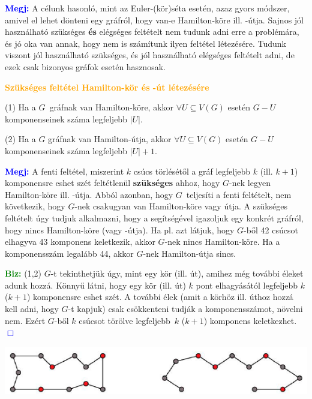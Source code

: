 \documentclass[../szamtud.tex]{subfiles}
\begin{document}
        \textcolor{blue}{\textbf{Megj:}} A célunk hasonló, mint az Euler-(kör)séta esetén, azaz gyors módszer, amivel el lehet dönteni egy gráfról, hogy van-e Hamilton-köre ill. -útja. Sajnos jól használható szükséges \textbf{és} elégséges feltételt nem tudunk adni erre a problémára, és jó oka van annak, hogy nem is számítunk ilyen feltétel létezésére. Tudunk viszont jól használható szükséges, és jól használható elégséges feltételt adni, de ezek csak bizonyos gráfok esetén hasznosak.
        
        \textcolor{orange}{\textbf{Szükséges feltétel Hamilton-kör és -út létezésére}}

        (1) Ha a $G$ gráfnak van Hamilton-köre, akkor $\forall U \subseteq V(G)$ esetén $G-U$ komponenseinek száma legfeljebb $|U|$.

        (2) Ha a $G$ gráfnak van Hamilton-útja, akkor $\forall U \subseteq V(G)$ esetén $G-U$ komponenseinek száma legfeljebb $|U|+1$. 

        \textcolor{blue}{\textbf{Megj:}} A fenti feltétel, miszerint $k$ csúcs törlésétől a gráf legfeljebb $k$ (ill. $k+1$) komponensre eshet szét feltétlenül \textbf{szükséges} ahhoz, hogy $G$-nek legyen Hamilton-köre ill. -útja. Abból azonban, hogy $G$ teljesíti a fenti feltételt, nem következik, hogy $G$-nek csakugyan van Hamilton-köre vagy útja. A szükséges feltételt úgy tudjuk alkalmazni, hogy a segítségével igazoljuk egy konkrét gráfról, hogy nincs Hamilton-köre (vagy -útja). Ha pl. azt látjuk, hogy $G$-ből 42 csúcsot elhagyva 43 komponens keletkezik, akkor $G$-nek nincs Hamilton-köre. Ha a komponensszám legalább 44, akkor $G$-nek Hamilton-útja sincs.
        
        \textcolor{green}{\textbf{Biz:}} (1,2) $G$-t tekinthetjük úgy, mint egy kör (ill. út), amihez még további éleket adunk hozzá. Könnyű látni, hogy egy kör (ill. út) $k$ pont elhagyásától legfeljebb $k$ ($k+1$) komponensre eshet szét. A további élek (amit a körhöz ill. úthoz hozzá kell adni, hogy $G$-t kapjuk) csak csökkenteni tudják a komponensszámot, növelni nem. Ezért $G$-ből $k$ csúcsot törölve legfeljebb $k$ ($k+1$) komponens keletkezhet. \textcolor{blue}{$\Box$}

        \includegraphics[width=\textwidth]{./img/4.png}
\end{document}
